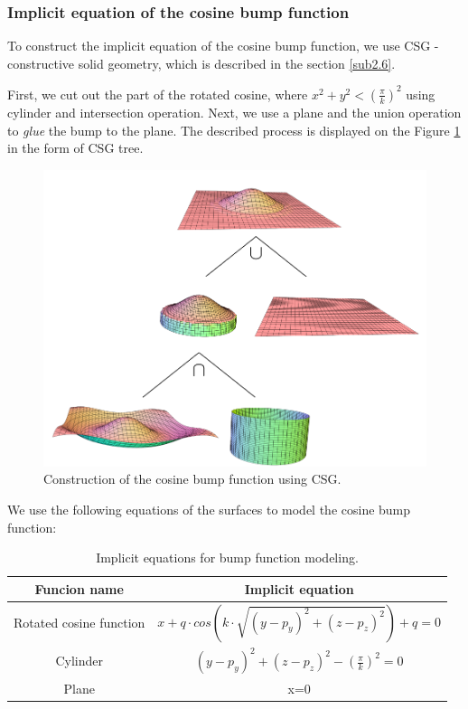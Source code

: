 \subsubsection*{Implicit equation of the cosine bump function}
To construct the implicit equation of the cosine bump function, we use CSG
- constructive solid geometry, which is described in the section \ref{sub2.6}.

First, we cut out the part of the rotated cosine, where
$x^2+y^2<(\frac{\pi}{k})^2$ using cylinder and intersection operation. Next,
we use a plane and the union operation to \textit{glue} the bump to the plane.
The described process is displayed on the Figure \ref{img:24} in the form of CSG tree.
\begin{figure}
    \centerline{\includegraphics[scale=0.5]{images/img24}}
    \caption[Construction of the cosine bump function using CSG]
    {Construction of the cosine bump function using CSG.}
    \label{img:24}
\end{figure}
We use the following equations of the surfaces to model the cosine bump function:

\begin{table}[]
    \centering
    \begin{tabular}{|c|c|}
        \hline\hline
    Funcion name            & Implicit equation                                        \\ \hline\hline
    Rotated cosine function & $x+q \cdot cos(k \cdot \sqrt{(y-p_y)^2+(z-p_z)^2})+q=0$  \\ \hline
    Cylinder                & $(y-p_y)^2+(z-p_z)^2-(\frac{\pi}{k})^2=0$                \\ \hline
    Plane                   & x=0                                                      \\ \hline\hline
    \end{tabular}
    \caption[Implicit equations for bump function modeling]
    {Implicit equations for bump function modeling.}
    \label{tab:1}
    \end{table}

